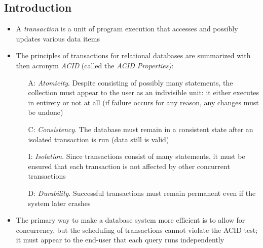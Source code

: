 \documentclass[a4paper]{article}
\begin{document}
\subsection{Introduction}
\begin{itemize}
    \item A \emph{transaction} is a unit of program execution that accesses and possibly updates various data items
    \item The principles of transactions for relational databases are summarized with then acronym \emph{ACID} (called the \emph{ACID Properties)}:
    \begin{itemize}
        \item[A:] \emph{Atomicity}. Despite consisting of possibly many statements, the collection must appear to the user as an indivisible unit: it either executes in entirety or not at all (if failure occurs for any reason, any changes must be undone)
        \item[C:] \emph{Consistency}. The database must remain in a consistent state after an isolated transaction is run (data still is valid)
        \item[I:] \emph{Isolation}. Since transactions consist of many statements, it must be ensured that each transaction is not affected by other concurrent transactions
        \item[D:] \emph{Durability}. Successful transactions must remain permanent even if the system later crashes
    \end{itemize}
    \item The primary way to make a database system more efficient is to allow for concurrency, but the scheduling of transactions cannot violate the ACID test; it must appear to the end-user that each query runs independently
\end{itemize}
\end{document}
